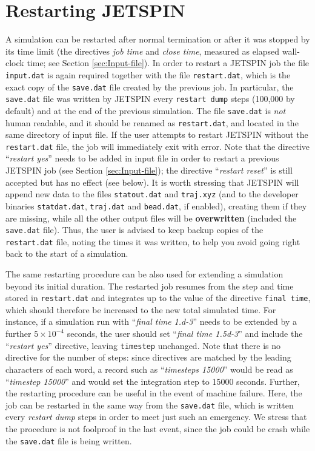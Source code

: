 
\section{Restarting JETSPIN\label{sec:Restarting-JETSPIN}}

A simulation can be restarted after normal termination or after it was
stopped by its time limit (the directives \textit{job time} and
\textit{close time}, measured as elapsed wall-clock time; see Section
\ref{sec:Input-file}). In order to restart
a JETSPIN job the file \texttt{input.dat} is again required together
with the file \texttt{restart.dat}, which is the exact copy of the
\texttt{save.dat} file created by the previous job. In particular,
the \texttt{save.dat} file was written by JETSPIN every
\texttt{restart dump} steps (100,000 by default) and at the end of the
previous simulation. The file \texttt{save.dat}
is \textit{not} human readable, and it should be renamed as \texttt{restart.dat},
and located in the same directory of input file. If the user attempts
to restart JETSPIN without the \texttt{restart.dat} file, the job
will immediately exit with error. Note that the directive ``\textit{restart
yes}'' needs to be added in input file in order to restart a previous
JETSPIN job (see Section \ref{sec:Input-file}); the directive
``\textit{restart reset}'' is still accepted but has no effect (see below).
It is worth stressing that JETSPIN will append new data to the files
\texttt{statout.dat} and \texttt{traj.xyz} (and to the developer binaries
\texttt{statdat.dat}, \texttt{traj.dat} and \texttt{bead.dat}, if
enabled), creating them if they are missing, while all the other output
files will be \textbf{overwritten} (included the \texttt{save.dat} file). Thus, the user is advised to keep backup
copies of the \texttt{restart.dat} file, noting the times it was written,
to help you avoid going right back to the start of a simulation.

The same restarting procedure can be also used for extending a simulation
beyond its initial duration. The restarted job resumes from the step and
time stored in \texttt{restart.dat} and integrates up to the value of the
directive \texttt{final time}, which should therefore be increased to the new
total simulated time. For instance, if a simulation run with
``\textit{final time 1.d-3}'' needs to be extended by a further
$5\times10^{-4}$ seconds, the user should set ``\textit{final time 1.5d-3}''
and include the ``\textit{restart yes}'' directive, leaving
\texttt{timestep} unchanged. Note that there is no directive for the number
of steps: since directives are matched by the leading characters of each
word, a record such as ``\textit{timesteps 15000}'' would be read as
``\textit{timestep 15000}'' and would set the integration step to 15000
seconds. Further,
the restarting procedure can be useful in the event of machine failure.
Here, the job can be restarted in the same way from the \texttt{save.dat}
file, which is written every \textit{restart dump} steps in order to meet
just such an emergency. We stress that the procedure is not foolproof
in the last event, since the job could be crash while the \texttt{save.dat}
file is being written.

